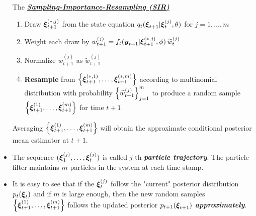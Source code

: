 \documentclass[11pt]{article}
\begin{document}
\begin{itemize}
The \underline{\emph{\textbf{Sampling-Importance-Resampling (SIR)}}}
\begin{enumerate}
\item Draw $\boldsymbol{\xi}_{t+1}^{(*,j)}$ from the state equation $q_{t}(\boldsymbol{\xi}_{t+1} | \boldsymbol{\xi}_{t}^{(j)}, \theta)$ for $j=1,\ldots, m$

\item Weight each draw by $w_{t+1}^{(j)} = f_{t}(\boldsymbol{y}_{t+1} | \boldsymbol{\xi}_{t+1}^{(*,j)}, \phi)\,\widetilde{w}_{t}^{(j)}$ 

\item Normalize $w_{t+1}^{(j)}$ as $\widetilde{w}_{t+1}^{(j)}$

\item \textbf{Resample} from $\left\{\boldsymbol{\xi}_{t+1}^{(*,1)}, \ldots, \boldsymbol{\xi}_{t+1}^{(*,m)}\right\}$ according to multinomial distribution with probability $\left\{\widetilde{w}_{t+1}^{(j)}\right\}_{j=1}^{m}$ to produce a random sample $\left\{\boldsymbol{\xi}_{t+1}^{(1)}, \ldots, \boldsymbol{\xi}_{t+1}^{(m)}\right\}$ for time $t+1$
\end{enumerate}
Averaging $\left\{\boldsymbol{\xi}_{t+1}^{(1)}, \ldots, \boldsymbol{\xi}_{t+1}^{(m)}\right\}$ will obtain the approximate conditional posterior mean estimator at $t+1$.

\item The sequence $(\boldsymbol{\xi}_1^{(j)}, \ldots, \boldsymbol{\xi}_{t}^{(j)})$ is called $j$-th \emph{\textbf{particle trajectory}}. The particle filter maintains $m$ particles in the system at each time stamp.



\item It is easy to see that if the $\boldsymbol{\xi}_{t}^{(j)}$ follow the "current" posterior distribution $p_{t}(\boldsymbol{\xi}_t)$ and if $m$ is large enough, then the new random samples $\left\{\boldsymbol{\xi}_{t+1}^{(1)}, \ldots, \boldsymbol{\xi}_{t+1}^{(m)}\right\}$ follows the updated posterior $p_{t+1}(\boldsymbol{\xi}_{t+1})$ \emph{\textbf{approximately}}.
\end{itemize}


\newpage


\end{document}
